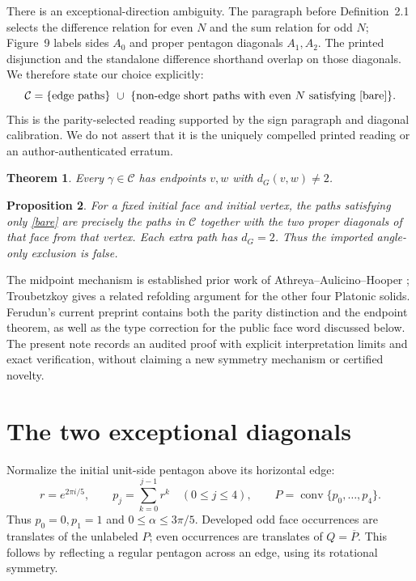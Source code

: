 \documentclass[11pt]{amsart}
\newtheorem{theorem}{Theorem}
\newtheorem{proposition}[theorem]{Proposition}
\theoremstyle{remark}
\newcommand{\C}{\mathcal C}
\begin{document}
There is an exceptional-direction ambiguity. The paragraph before Definition~2.1 selects the difference relation for even $N$ and the sum relation for odd $N$; Figure~9 labels sides $A_0$ and proper pentagon diagonals $A_1,A_2$. The printed disjunction and the standalone difference shorthand overlap on those diagonals. We therefore state our choice explicitly:
\[
\C=\{\text{edge paths}\}\ \cup\
 \{\text{non-edge short paths with even }N\text{ satisfying \eqref{bare}}\}.
\]
This is the parity-selected reading supported by the sign paragraph and diagonal calibration. We do not assert that it is the uniquely compelled printed reading or an author-authenticated erratum.

\begin{theorem}\label{main}
Every $\gamma\in\C$ has endpoints $v,w$ with $d_G(v,w)\ne2$.
\end{theorem}
\begin{proposition}\label{literal}
For a fixed initial face and initial vertex, the paths satisfying only \eqref{bare} are precisely the paths in $\C$ together with the two proper diagonals of that face from that vertex. Each extra path has $d_G=2$. Thus the imported angle-only exclusion is false.
\end{proposition}

The midpoint mechanism is established prior work of Athreya--Aulicino--Hooper \cite[\S5]{AAH}; Troubetzkoy \cite{Troubetzkoy} gives a related refolding argument for the other four Platonic solids. Ferudun's current preprint \cite[Remark~1.2 and \S7]{Ferudun} contains both the parity distinction and the endpoint theorem, as well as the type correction for the public face word discussed below. The present note records an audited proof with explicit interpretation limits and exact verification, without claiming a new symmetry mechanism or certified novelty.

\section{The two exceptional diagonals}
Normalize the initial unit-side pentagon above its horizontal edge:
\[
 r=e^{2\pi i/5},\qquad p_j=\sum_{k=0}^{j-1}r^k
 \quad(0\le j\le4),\qquad P=\operatorname{conv}\{p_0,\ldots,p_4\}.
\]
Thus $p_0=0,p_1=1$ and $0\le\alpha\le3\pi/5$. Developed odd face occurrences are translates of the unlabeled $P$; even occurrences are translates of $Q=\overline P$. This follows by reflecting a regular pentagon across an edge, using its rotational symmetry.
\end{document}
